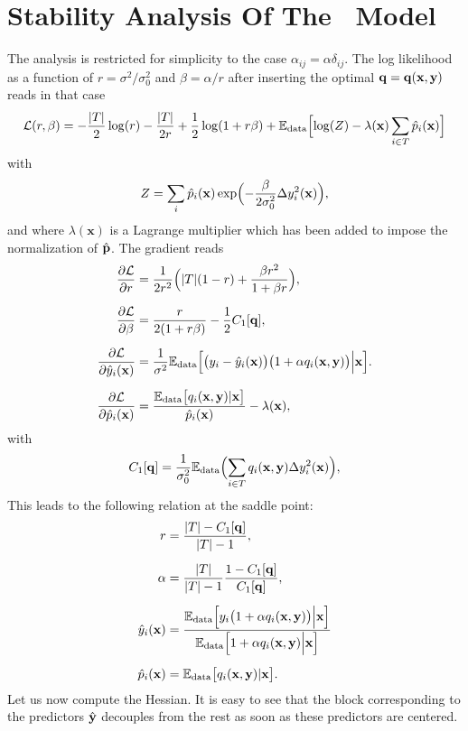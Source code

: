 \chapter{Stability Analysis Of The \XX \ Model}\label{app:Hessian}
The analysis is restricted for simplicity to the case $\alpha_{ij}=\alpha\delta_{ij}$.
The log likelihood as a function of $r=\sigma^2/\sigma_0^2$ and $\beta=\alpha/r$ after inserting the optimal
${\bf q} = {\bf q}(\mathbf{x},{\bf y})$ reads in that case
\[
{\cal L}(r,\beta) = -\frac{\vert  T\vert}{2}\log(r)-\frac{\vert  T\vert}{2r}+\frac{1}{2}\log(1+r\beta)+{\mathbb E}_{\rm data}\Bigl[\log(Z)-\lambda(\mathbf{x})\sum_{i\in  T} \hat p_i(\mathbf{x})\Bigr]
\]
with
\[
Z = \sum_i \hat p_i(\mathbf{x})\exp\Bigl(-\frac{\beta}{2\sigma_0^2}\Delta y_i^2(\mathbf{x})\Bigr),
\]
and where $\lambda(\mathbf{x})$ is a Lagrange multiplier which has been added to impose the normalization of $\hat {\bf p}$.
The gradient reads
\begin{align*}
  \frac{\partial {\cal L}}{\partial r} &= \frac{1}{2r^2}\Bigl(\vert  T\vert(1-r)+\frac{\beta r^2}{1+\beta r}\Bigr),\\[0.2cm]
  \frac{\partial {\cal L}}{\partial \beta} &= \frac{r}{2(1+r\beta)}-\frac{1}{2}C_1[{\bf q}],\\[0.2cm]
  \frac{\partial{\cal L}}{\partial \hat y_i(\mathbf{x})} &= \frac{1}{\sigma^2}{\mathbb E}_{\rm data}\Bigl[ \bigl(y_i-\hat y_i(\mathbf{x})\bigr)\bigl(1+\alpha q_i(\mathbf{x},{\bf y})\bigr)\Big\vert \mathbf{x}\Bigr].\\[0.2cm]
  \frac{\partial {\cal L}}{\partial \hat p_i(\mathbf{x})} &= \frac{{\mathbb E}_{\rm data}\bigl[ q_i(\mathbf{x},{\bf y})\vert \mathbf{x} \bigr]}{\hat p_i(\mathbf{x})}-\lambda(\mathbf{x}),
\end{align*}
with
\[
C_1[{\bf q}] = \frac{1}{\sigma_0^2}{\mathbb E}_{\rm data}\Bigl(\sum_{i\in  T} q_i(\mathbf{x},{\bf y})\Delta y_i^2(\mathbf{x})\Bigr),
\]
This leads to the following relation at the saddle point:
\begin{align*}
  r &= \frac{\vert  T\vert-C_1[{\bf q}]}{\vert  T\vert-1},\\[0.2cm]
  \alpha &= \frac{\vert  T\vert}{\vert  T\vert-1}\frac{1-C_1[{\bf q}]}{C_1[{\bf q}]},\\[0.2cm]
\hat y_i(\mathbf{x}) &= \frac{{\mathbb E}_{\rm data}\Bigl[y_i\bigl(1+\alpha q_i(\mathbf{x},{\bf y})\bigr)\Big\vert \mathbf{x}\Bigr]}
{{\mathbb E}_{\rm data}\Bigl[1+\alpha q_i(\mathbf{x},{\bf y})\Big\vert \mathbf{x}\Bigr]}\\[0.2cm]
  \hat p_i(\mathbf{x}) &= \mathbb{E}_{\rm data}\bigl[ q_i(\mathbf{x},{\bf y})\vert \mathbf{x} \bigr].
\end{align*}
Let us now compute the Hessian. It is easy to see that the block corresponding to the predictors $\hat{\bf y}$ decouples from the rest as soon as these predictors are centered. 

